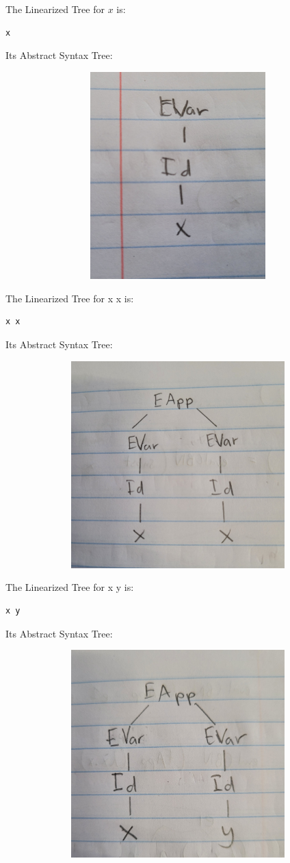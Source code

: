 \documentclass{article}
\theoremstyle{theorem}
\theoremstyle{definition}
\theoremstyle{remark}
\begin{document}
The Linearized Tree for $x$ is:
\begin{lstlisting}
x
\end{lstlisting}

Its Abstract Syntax Tree:

\includegraphics[width=15cm, height=8cm]{Report Images/week5_1.jpg}

The Linearized Tree for x x is:
\begin{lstlisting}
x x
\end{lstlisting}

Its Abstract Syntax Tree:

\includegraphics[width=15cm, height=8cm]{Report Images/week5_2.jpg}

The Linearized Tree for x y is:
\begin{lstlisting}
x y
\end{lstlisting}

Its Abstract Syntax Tree:

\includegraphics[width=15cm, height=8cm]{Report Images/week5_3.jpg}
\end{document}
